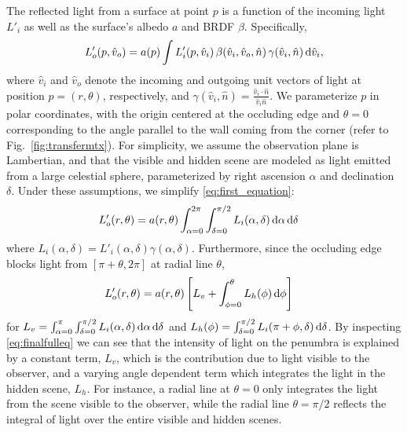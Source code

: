 The reflected light from a surface at point $p$ is a function of the incoming light $L'_i$ as well as the surface's albedo $ a $ and BRDF 
$\beta$. Specifically, 
\begin{align}
L_o'(p,\hat{v}_o) = a(p) \int L'_i(p,\hat{v}_i) \, \beta( \hat{v}_i, \hat{v}_o, \hat{n} ) \,\gamma(\hat{v}_i, \hat{n}) \, \mathrm{d} \hat{v}_i,
\label{eq:first_equation}
\end{align}
where $\hat{v}_i$ and $\hat{v}_o$ denote the incoming and outgoing unit vectors of light at position $p = (r,\theta)$, respectively, and $\gamma(\hat{v}_i, \hat{n}) = \frac{ \hat{v}_i \cdot \hat{n} }{  \hat{v}_i  \hat{n} }$.
We parameterize $p$ in polar coordinates, with the origin centered at the occluding edge and $\theta=0$ corresponding to the angle parallel to the wall coming from the corner (refer to Fig.~\ref{fig:transfermtx}). For simplicity, we assume the observation plane is Lambertian, and that the visible and hidden scene are modeled as light emitted from a large celestial sphere, parameterized by right ascension $\alpha$ and declination $\delta$. Under these assumptions, we simplify \eqref{eq:first_equation}: 
\begin{align}
L'_o(r,\theta) &= a(r,\theta) \int_{\alpha=0}^{2 \pi} \int_{\delta=0}^{\pi/2} L_i(\alpha, \delta) \, \mathrm{d} \alpha \, \mathrm{d} \delta 
\end{align}
where $L_i(\alpha, \delta) = L'_i(\alpha, \delta)  \gamma(\alpha, \delta)$. Furthermore, since the occluding edge blocks light from $[\pi+\theta, 2 \pi]$ at radial line $\theta$, 
\begin{align}
L'_o(r,\theta) & = a(r,\theta) \left[ L_v + \int_{\phi=0}^{\theta}  L_h(\phi)\, \mathrm{d} \phi \right]
\label{eq:finalfulleq}
\end{align}
for {\small $L_v = \int_{\alpha=0}^{\pi} \int_{\delta=0}^{\pi/2} L_i(\alpha, \delta) \, \mathrm{d} \alpha\, \mathrm{d} \delta$} and {\small $L_h(\phi) = \int_{\delta=0}^{\pi/2} L_i(\pi + \phi, \delta)\, \mathrm{d} \delta$}. By inspecting \eqref{eq:finalfulleq} we can see that the intensity of light on the penumbra is explained by a constant term, $L_v$, 
which is the contribution due to light visible to the observer, and a varying angle dependent term which integrates the light in the hidden scene, $L_h$. 
For instance, a radial line at $\theta=0$ only integrates the light from the scene visible to the observer, while the radial line $\theta=\pi/2$ reflects the integral of light over the entire visible and hidden scenes.  




